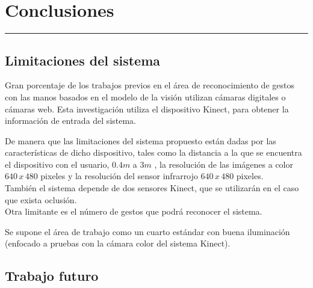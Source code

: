 \chapter{Conclusiones}\label{capit:cap6}
\vspace{-2.0325ex}%
\noindent
\rule{\textwidth}{0.5pt}
\vspace{-5.5ex}%
\newcommand{\pushline}{\Indp}%



\section{Limitaciones del sistema}

Gran porcentaje de los trabajos previos en el \'area de reconocimiento de gestos con las manos basados en el modelo de la visión  utilizan c\'amaras digitales o c\'amaras web. Esta investigación utiliza el dispositivo Kinect, para obtener la información de entrada del sistema. 

De  manera que las limitaciones del sistema propuesto están dadas por las características de dicho dispositivo, tales como la distancia a la que se encuentra el dispositivo con el usuario, $0.4m$ a $3m$ , la resolución de las imágenes a color $640 \, x \, 480$ pixeles y la resolución del sensor infrarrojo $640 \, x \, 480$ pixeles.\\
También el sistema depende de dos sensores Kinect, que se utilizar\'an en el caso que exista oclusión. \\
Otra limitante es el número de gestos que podrá reconocer el sistema.

Se supone el área de trabajo como un cuarto estándar con buena iluminación (enfocado a pruebas con la cámara color del sistema Kinect).

\section{Trabajo futuro}\label{futureWork} 
\newpage
